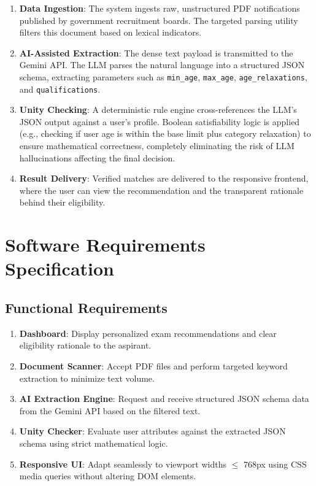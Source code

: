 \documentclass[conference]{IEEEtran}
\begin{document}
\begin{enumerate}
    \item \textbf{Data Ingestion}: The system ingests raw, unstructured PDF notifications published by government recruitment boards. The targeted parsing utility filters this document based on lexical indicators.
    \item \textbf{AI-Assisted Extraction}: The dense text payload is transmitted to the Gemini API. The LLM parses the natural language into a structured JSON schema, extracting parameters such as \texttt{min\_age}, \texttt{max\_age}, \texttt{age\_relaxations}, and \texttt{qualifications}.
    \item \textbf{Unity Checking}: A deterministic rule engine cross-references the LLM's JSON output against a user's profile. Boolean satisfiability logic is applied (e.g., checking if user age is within the base limit plus category relaxation) to ensure mathematical correctness, completely eliminating the risk of LLM hallucinations affecting the final decision.
    \item \textbf{Result Delivery}: Verified matches are delivered to the responsive frontend, where the user can view the recommendation and the transparent rationale behind their eligibility.
\end{enumerate}

\section{Software Requirements Specification}

\subsection{Functional Requirements}
\begin{enumerate}
    \item \textbf{Dashboard}: Display personalized exam recommendations and clear eligibility rationale to the aspirant.
    \item \textbf{Document Scanner}: Accept PDF files and perform targeted keyword extraction to minimize text volume.
    \item \textbf{AI Extraction Engine}: Request and receive structured JSON schema data from the Gemini API based on the filtered text.
    \item \textbf{Unity Checker}: Evaluate user attributes against the extracted JSON schema using strict mathematical logic.
    \item \textbf{Responsive UI}: Adapt seamlessly to viewport widths $\le$ 768px using CSS media queries without altering DOM elements.
\end{enumerate}
\end{document}
